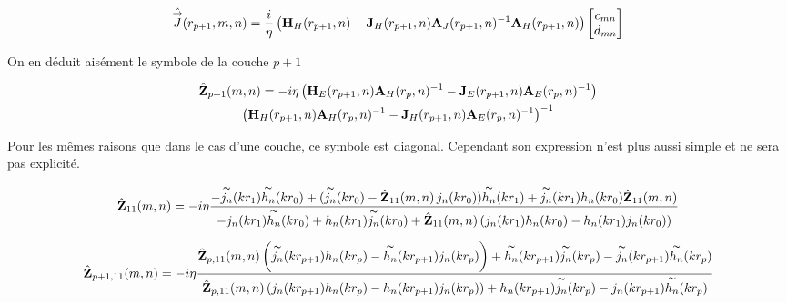         \begin{equation}
            \hat{{\overset{\rightarrow}{J}}}(r_{p+1},m,n) = \dfrac{i}{\eta}
            \left(
                \mathbf{H}_{H}(r_{p+1},n)
                -
                \mathbf{J}_{H}(r_{p+1},n)
                \mathbf{A}_{J}(r_{p+1},n)^{-1}
                \mathbf{A}_{H}(r_{p+1},n)
            \right)
            \begin{bmatrix}
                c_{mn}
                \\
                d_{mn}
            \end{bmatrix}
        \end{equation}

        On en déduit aisément le symbole de la couche \(p+1\)

        \begin{multline}
            \hat{\mathbf{Z}}_{p+1}(m,n) = -i\eta
            \left(
                \mathbf{H}_{E}(r_{p+1},n)
                \mathbf{A}_{H}(r_p,n)^{-1}
                -
                \mathbf{J}_{E}(r_{p+1},n)
                \mathbf{A}_{E}(r_p,n)^{-1}
            \right)
            \\
            \left(
                \mathbf{H}_{H}(r_{p+1},n)
                \mathbf{A}_{H}(r_p,n)^{-1}
                -
                \mathbf{J}_{H}(r_{p+1},n)
                \mathbf{A}_{E}(r_p,n)^{-1}
            \right)^{-1}
        \end{multline}

        Pour les mêmes raisons que dans le cas d'une couche, ce symbole est diagonal. Cependant son expression n'est plus aussi simple et ne sera pas explicité.

        \begin{equation}
            \hat{\mathbf{Z}}_{11}(m,n) = -i\eta
              \dfrac{-\overset{\thicksim}{j_{n}}  ( kr_{1} ) \overset{\thicksim}{h_{n}}  ( kr_{0} ) + ( \overset{\thicksim}{j_{n}}  ( kr_{0} ) -\hat{\mathbf{Z}}_{11}(m,n)\,j_{n} ( kr_{0} )  ) \overset{\thicksim}{h_{n}}  ( kr_{1} ) +\overset{\thicksim}{j_{n}}  ( kr_{1} ) h_{n} ( kr_{0} ) \hat{\mathbf{Z}}_{11}(m,n)}{-j_{n} ( kr_{1} ) \overset{\thicksim}{h_{n}}  ( kr_{0} ) +h_{n} ( kr_{1} ) \overset{\thicksim}{j_{n}}  ( kr_{0} ) +\hat{\mathbf{Z}}_{11}(m,n)\, ( j_{n} ( kr_{1} ) h_{n} ( kr_{0} ) -h_{n} ( kr_{1} ) j_{n} ( kr_{0} )  ) }
      \end{equation}

      \begin{equation}
            \hat{\mathbf{Z}}_{p+1,11}(m,n) = -i\eta
              \dfrac{\hat{\mathbf{Z}}_{p,11}(m,n) \left( \overset{\thicksim}{j_n}(kr_{p+1})h_n(kr_p) - \overset{\thicksim}{h_n}(kr_{p+1})j_n(kr_p) \right) + \overset{\thicksim}{h_n}(kr_{p+1})\overset{\thicksim}{j_n}(kr_p) - \overset{\thicksim}{j_n}(kr_{p+1})\overset{\thicksim}{h_n}(kr_p)}{\hat{\mathbf{Z}}_{p,11}(m,n) \left( j_n(kr_{p+1})h_n(kr_p) - h_n(kr_{p+1})j_n(kr_p) \right) + h_n(kr_{p+1})\overset{\thicksim}{j_n}(kr_p) - j_n(kr_{p+1})\overset{\thicksim}{h_n}(kr_p)}
      \end{equation}

